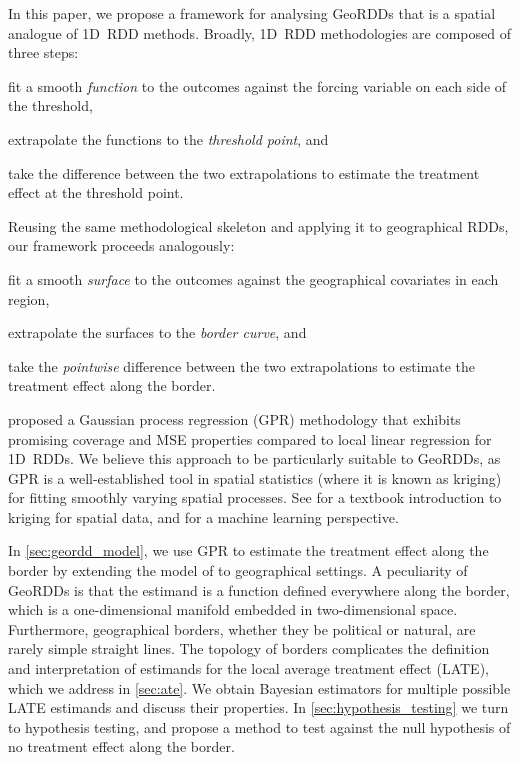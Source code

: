 In this paper, we propose a framework for analysing GeoRDDs that is a spatial analogue of 1D~RDD methods.
Broadly, 1D~RDD methodologies are composed of three steps:
\begin{flatlist}
    \item
        fit a smooth \emph{function} to the outcomes against the forcing variable on each side of the threshold,
    \item
        extrapolate the functions to the \emph{threshold point}, and
    \item
        take the difference between the two extrapolations to estimate the treatment effect at the threshold point.
\end{flatlist}
Reusing the same methodological skeleton and applying it to geographical RDDs, our framework proceeds analogously:
\begin{flatlist}
    \item
        fit a smooth \emph{surface} to the outcomes against the geographical covariates in each region,
    \item
        extrapolate the surfaces to the \emph{border curve}, and
    \item
        take the \emph{pointwise} difference between the two extrapolations to estimate the treatment effect along the border.
\end{flatlist}

\cite{Branson:2017qy} proposed a Gaussian process regression (GPR) methodology that exhibits promising coverage and MSE properties compared to local linear regression for 1D~RDDs.
We believe this approach to be particularly suitable to GeoRDDs, as GPR is a well-established tool in spatial statistics (where it is known as kriging) for fitting smoothly varying spatial processes.
See \cite{banerjee2014hierarchical} for a textbook introduction to kriging for spatial data, and \cite{rasmussen2006gaussian} for a machine learning perspective.

In \autoref{sec:geordd_model}, we use GPR to estimate the treatment effect along the border by extending the model of \cite{Branson:2017qy} to geographical settings.
A peculiarity of GeoRDDs is that the estimand is a function defined everywhere along the border, which is a one-dimensional manifold embedded in two-dimensional space.
Furthermore, geographical borders, whether they be political or natural, are rarely simple straight lines.
The topology of borders complicates the definition and interpretation of estimands for the local average treatment effect (LATE), which we address in \autoref{sec:ate}.
We obtain Bayesian estimators for multiple possible LATE estimands and discuss their properties.
In \autoref{sec:hypothesis_testing} we turn to hypothesis testing, and propose a method to test against the null hypothesis of no treatment effect along the border.

